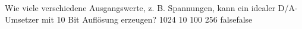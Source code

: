     {Wie viele verschiedene Ausgangswerte, z. B. Spannungen, kann ein idealer D/A-Umsetzer mit 10 Bit Auflösung erzeugen?}
    {1024}
    {10}
    {100}
    {256}
    {false}{false}
